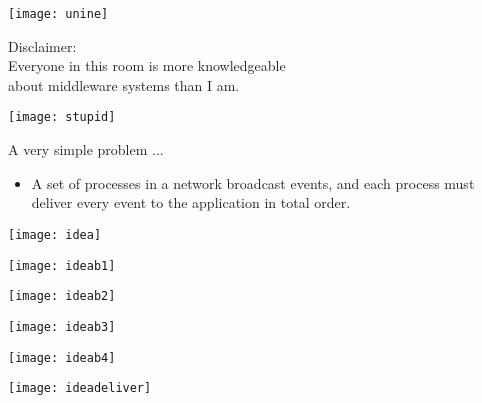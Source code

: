 



\begin{frame}[plain]
  
\titlepage

\begin{center}
\texttt{[image: unine]}
\end{center}

\end{frame}


\begin{frame}[plain]{}

\begin{snugshade}
  \begin{center}
    Disclaimer: \\Everyone in this room is more knowledgeable \\ about middleware systems than I am.
  \end{center}
\end{snugshade}


\vspace{1cm}

\begin{center}
\texttt{[image: stupid]}
\end{center}

\end{frame}


\subtitle[Introduction]{Introduction}


\begin{frame}{A very simple problem ...}
  
  \begin{itemize}
  \item A set of processes in a network broadcast events, and each process must deliver every event to the application in total order.
  \end{itemize}

\centering


{
\texttt{[image: idea]}
}

{
\texttt{[image: ideab1]}
}

{
\texttt{[image: ideab2]}
}

{
\texttt{[image: ideab3]}
}

{
\texttt{[image: ideab4]}
}

{
\texttt{[image: ideadeliver]}
}


\end{frame}

